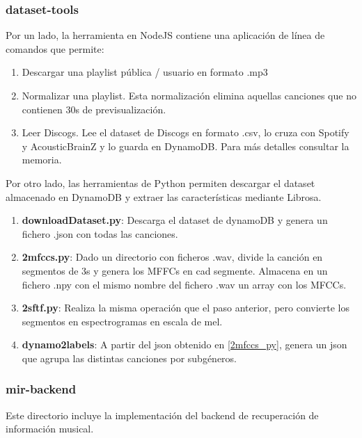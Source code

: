 \subsubsection{dataset-tools}\label{dataset-tools}

Por un lado, la herramienta en NodeJS contiene una aplicación de línea de comandos que permite:

\begin{enumerate}
    \item Descargar una playlist pública / usuario en formato .mp3
    \item Normalizar una playlist. Esta normalización elimina aquellas canciones que no contienen 30s de previsualización. 
    \item Leer Discogs. Lee el dataset de Discogs en formato .csv, lo cruza con Spotify y AcousticBrainZ y lo guarda en DynamoDB. Para más detalles consultar la memoria.
\end{enumerate}

Por otro lado, las herramientas de Python permiten descargar el dataset almacenado en DynamoDB y extraer las características mediante Librosa. 

\begin{enumerate}
    \item \textbf{downloadDataset.py}: Descarga el dataset de dynamoDB y genera un fichero .json con todas las canciones. 
    \item \textbf{2mfccs.py}\label{2mfccs_py}: Dado un directorio con ficheros .wav, divide la canción en segmentos de 3s y genera los MFFCs en cad segmente. Almacena en un fichero .npy con el mismo nombre del fichero .wav un array con los MFCCs. 
    \item \textbf{2sftf.py}: Realiza la misma operación que el paso anterior, pero convierte los segmentos en espectrogramas en escala de mel. 
    \item \textbf{dynamo2labels}: A partir del json obtenido en \ref{2mfccs_py}, genera un json que agrupa las distintas canciones por subgéneros.
\end{enumerate}


\subsubsection{mir-backend}\label{mir-backend}

Este directorio incluye la implementación del backend de recuperación de información musical. 

